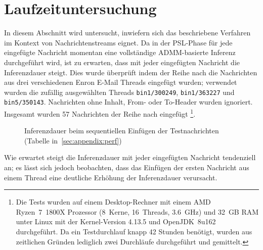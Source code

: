 \section{Laufzeituntersuchung}%
\label{sec:evaluation:time}

In diesem Abschnitt wird untersucht, inwiefern sich das beschriebene Verfahren im Kontext von Nachrichtenstreams eignet.
Da in der PSL-Phase für jede eingefügte Nachricht momentan eine vollständige ADMM-basierte Inferenz durchgeführt wird, ist zu erwarten, dass mit jeder eingefügten Nachricht die Inferenzdauer steigt.
Dies wurde überprüft indem der Reihe nach die Nachrichten aus drei verschiedenen Enron E-Mail Threads eingefügt wurden;
verwendet wurden die zufällig ausgewählten Threads \texttt{bin1/300249}, \texttt{bin1/363227} und \texttt{bin5/350143}.
Nachrichten ohne Inhalt, From- oder To-Header wurden ignoriert.
Insgesamt wurden 57 Nachrichten der Reihe nach eingefügt%
\footnote{Die Tests wurden auf einem Desktop-Rechner mit einem AMD Ryzen~7~1800X Prozessor (8~Kerne, 16~Threads, 3.6~GHz) und 32~GB RAM unter Linux mit der Kernel-Version 4.13.5 und OpenJDK~8u162 durchgeführt.
Da ein Testdurchlauf knapp 42 Stunden benötigt, wurden aus zeitlichen Gründen lediglich zwei Durchläufe durchgeführt und gemittelt.}.
\begin{figure}[h]
	\centering
	\caption{Inferenzdauer beim sequentiellen Einfügen der Testnachrichten (Tabelle in~\ref{sec:appendix:perf})}\label{fig:evaluation:perf}
\end{figure}
Wie erwartet steigt die Inferenzdauer mit jeder eingefügten Nachricht tendenziell an; es lässt sich jedoch beobachten, dass das Einfügen der ersten Nachricht aus einem Thread eine deutliche Erhöhung der Inferenzdauer verursacht.
